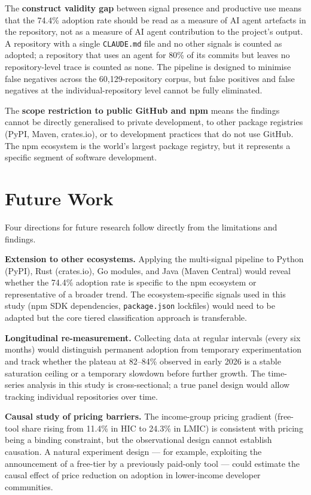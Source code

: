 The \textbf{construct validity gap} between signal presence and productive use means that the 74.4\% adoption rate should be read as a measure of AI agent artefacts in the repository, not as a measure of AI agent contribution to the project's output. A repository with a single \texttt{CLAUDE.md} file and no other signals is counted as adopted; a repository that uses an agent for 80\% of its commits but leaves no repository-level trace is counted as none. The pipeline is designed to minimise false negatives across the 60,129-repository corpus, but false positives and false negatives at the individual-repository level cannot be fully eliminated.

The \textbf{scope restriction to public GitHub and npm} means the findings cannot be directly generalised to private development, to other package registries (PyPI, Maven, crates.io), or to development practices that do not use GitHub. The npm ecosystem is the world's largest package registry, but it represents a specific segment of software development.

\section{Future Work}
\label{sec:conc:future}

Four directions for future research follow directly from the limitations and findings.

\textbf{Extension to other ecosystems.} Applying the multi-signal pipeline to Python (PyPI), Rust (crates.io), Go modules, and Java (Maven Central) would reveal whether the 74.4\% adoption rate is specific to the npm ecosystem or representative of a broader trend. The ecosystem-specific signals used in this study (npm SDK dependencies, \texttt{package.json} lockfiles) would need to be adapted but the core tiered classification approach is transferable.

\textbf{Longitudinal re-measurement.} Collecting data at regular intervals (every six months) would distinguish permanent adoption from temporary experimentation and track whether the plateau at 82--84\% observed in early 2026 is a stable saturation ceiling or a temporary slowdown before further growth. The time-series analysis in this study is cross-sectional; a true panel design would allow tracking individual repositories over time.

\textbf{Causal study of pricing barriers.} The income-group pricing gradient (free-tool share rising from 11.4\% in HIC to 24.3\% in LMIC) is consistent with pricing being a binding constraint, but the observational design cannot establish causation. A natural experiment design --- for example, exploiting the announcement of a free-tier by a previously paid-only tool --- could estimate the causal effect of price reduction on adoption in lower-income developer communities.

